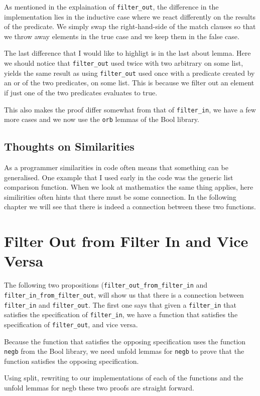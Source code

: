 \documentclass{article}
\begin{document}
As mentioned in the explaination of \texttt{filter\_out}, the difference in the implementation lies in the inductive case where we react differently on the results of the predicate. We simply swap the right-hand-side of the match clauses so that we throw away elements in the true case and we keep them in the false case.

The last difference that I would like to highligt is in the last about lemma. Here we should notice that \texttt{filter\_out} used twice with two arbitrary on some list, yields the same result as using \texttt{filter\_out} used once with a predicate created by an or of the two predicates, on some list. This is because we filter out an element if just one of the two predicates evaluates to true.

This also makes the proof differ somewhat from that of \texttt{filter\_in}, we have a few more cases and we now use the \texttt{orb} lemmas of the Bool library.

\subsection{Thoughts on Similarities}
As a programmer similarities in code often means that something can be generalised. One example that I used early in the code was the generic list comparison function. When we look at mathematics the same thing applies, here similirities often hints that there must be some connection. In the following chapter we will see that there is indeed a connection between these two functions.

\section{Filter Out from Filter In and Vice Versa}
The following two propositions (\texttt{filter\_out\_from\_filter\_in} and \texttt{filter\_in\_from\_filter\_out}, will show us that there is a connection between \texttt{filter\_in} and \texttt{filter\_out}. The first one says that given a \texttt{filter\_in} that satisfies the specification of \texttt{filter\_in}, we have a function that satisfies the specification of \texttt{filter\_out}, and vice versa.

Because the function that satisfies the opposing specification uses the function \texttt{negb} from the Bool library, we need unfold lemmas for \texttt{negb} to prove that the function satisfies the opposing specification.

Using split, rewriting to our implementations of each of the functions and the unfold lemmas for negb these two proofs are straight forward.
\end{document}
